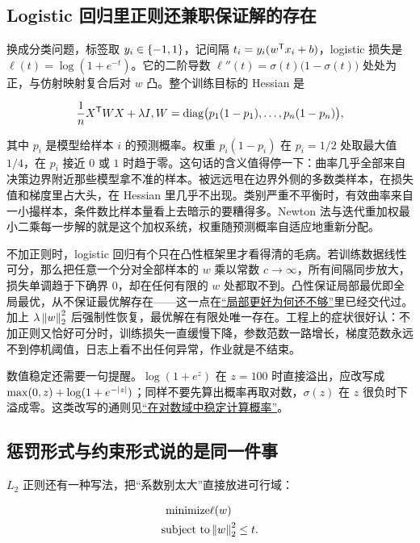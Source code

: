 \subsection{Logistic 回归里正则还兼职保证解的存在}

换成分类问题，标签取 \(y_i\in\left\{-1,1\right\}\)，记间隔 \(t_i=y_i(w^{\mathsf{T}}x_i+b)\)，logistic 损失是 \(\ell(t)=\log(1+e^{-t})\)。它的二阶导数 \(\ell''(t)=\sigma(t)\bigl(1-\sigma(t)\bigr)\) 处处为正，与仿射映射复合后对 \(w\) 凸。整个训练目标的 Hessian 是

\[
\frac1nX^{\mathsf{T}}WX+\lambda I,\space W=\operatorname{diag}\bigl(p_1(1-p_1),\dots,p_n(1-p_n)\bigr),
\]

其中 \(p_i\) 是模型给样本 \(i\) 的预测概率。权重 \(p_i(1-p_i)\) 在 \(p_i=1/2\) 处取最大值 \(1/4\)，在 \(p_i\) 接近 \(0\) 或 \(1\) 时趋于零。这句话的含义值得停一下：曲率几乎全部来自决策边界附近那些模型拿不准的样本。被远远甩在边界外侧的多数类样本，在损失值和梯度里占大头，在 Hessian 里几乎不出现。类别严重不平衡时，有效曲率来自一小撮样本，条件数比样本量看上去暗示的要糟得多。Newton 法与迭代重加权最小二乘每一步解的就是这个加权系统，权重随预测概率自适应地重新分配。

不加正则时，logistic 回归有个只在凸性框架里才看得清的毛病。若训练数据线性可分，那么把任意一个分对全部样本的 \(w\) 乘以常数 \(c\to\infty\)，所有间隔同步放大，损失单调趋于下确界 \(0\)，却在任何有限的 \(w\) 处都取不到。凸性保证局部最优即全局最优，从不保证最优解存在——这一点在\hyperref[sec:09-Convex-Optimization/01-Optimization-Foundations/02]{``局部更好为何还不够''}里已经交代过。加上 \(\lambda\left\lVert w\right\rVert_2^2\) 后强制性恢复，最优解在有限处唯一存在。工程上的症状很好认：不加正则又恰好可分时，训练损失一直缓慢下降，参数范数一路增长，梯度范数永远不到停机阈值，日志上看不出任何异常，作业就是不结束。

数值稳定还需要一句提醒。\(\log(1+e^{z})\) 在 \(z=100\) 时直接溢出，应改写成 \(\max(0,z)+\log(1+e^{-\left|z\right|})\)；同样不要先算出概率再取对数，\(\sigma(z)\) 在 \(z\) 很负时下溢成零。这类改写的通则见\hyperref[sec:08-Numerical-Analysis/07-Numerical-Methods-for-ML/01]{``在对数域中稳定计算概率''}。

\subsection{惩罚形式与约束形式说的是同一件事}

\(L_2\) 正则还有一种写法，把``系数别太大''直接放进可行域：

\[
\begin{aligned}
\text{minimize}\space & \ell(w)\\
\text{subject to}\space & \left\lVert w\right\rVert_2^2\le t .
\end{aligned}
\]

